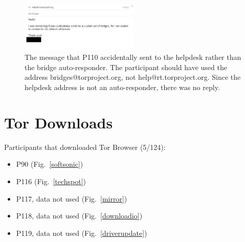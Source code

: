 \documentclass[USenglish,oneside,twocolumn]{article}
\begin{document}
\begin{figure}[h]
\includegraphics[width=0.5\textwidth]{../experiment/processing/failed-participants/20160328-133857-bridgeresponder-redacted.png}
\caption{The message that P110 accidentally sent to the helpdesk rather than the bridge auto-responder. The participant should have used the address bridges@torproject.org, not help@rt.torproject.org. Since the helpdesk address is not an auto-responder, there was no reply.}
\label{autoresponder2}
\end{figure} 

\section{Tor Downloads}
\label{tor-downloads}

Participants that downloaded Tor Browser (5/124): 
\begin{itemize}
\item P90 (Fig.~\ref{softsonic})
\item P116 (Fig.~\ref{techspot})
\item P117, data not used (Fig.~\ref{mirror})
\item P118, data not used (Fig.~\ref{downloadio})
\item P119, data not used (Fig.~\ref{driverupdate})
\end{itemize} 

\end{document}
